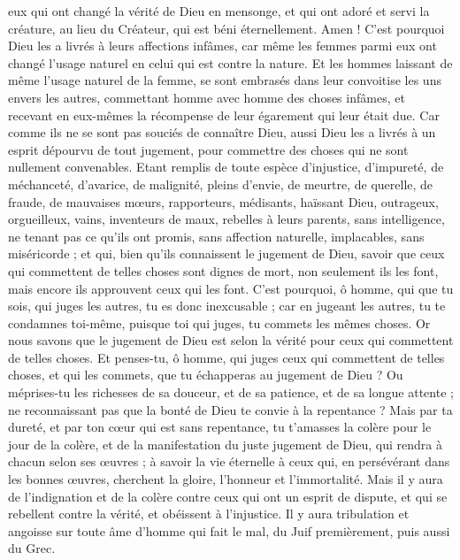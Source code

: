 \begin{multicols}{2}
eux qui ont changé la vérité de Dieu en mensonge, et qui ont adoré et servi la créature, au lieu du Créateur, qui est béni éternellement. Amen !
C'est pourquoi Dieu les a livrés à leurs affections infâmes, car même les femmes parmi eux ont changé l'usage naturel en celui qui est contre la nature.
Et les hommes laissant de même l'usage naturel de la femme, se sont embrasés dans leur convoitise les uns envers les autres, commettant homme avec homme des choses infâmes, et recevant en eux-mêmes la récompense de leur égarement qui leur était due.
Car comme ils ne se sont pas souciés de connaître Dieu, aussi Dieu les a livrés à un esprit dépourvu de tout jugement, pour commettre des choses qui ne sont nullement convenables.
Etant remplis de toute espèce d'injustice, d'impureté, de méchanceté, d'avarice, de malignité, pleins d'envie, de meurtre, de querelle, de fraude, de mauvaises mœurs,
rapporteurs, médisants, haïssant Dieu, outrageux, orgueilleux, vains, inventeurs de maux, rebelles à leurs parents,
sans intelligence, ne tenant pas ce qu'ils ont promis, sans affection naturelle, implacables, sans miséricorde ;
et qui, bien qu'ils connaissent le jugement de Dieu, savoir que ceux qui commettent de telles choses sont dignes de mort, non seulement ils les font, mais encore ils approuvent ceux qui les font.
\VerseOne{}C'est pourquoi, ô homme, qui que tu sois, qui juges les autres, tu es donc inexcusable ; car en jugeant les autres, tu te condamnes toi-même, puisque toi qui juges, tu commets les mêmes choses.
Or nous savons que le jugement de Dieu est selon la vérité pour ceux qui commettent de telles choses.
Et penses-tu, ô homme, qui juges ceux qui commettent de telles choses, et qui les commets, que tu échapperas au jugement de Dieu ?
Ou méprises-tu les richesses de sa douceur, et de sa patience, et de sa longue attente ; ne reconnaissant pas que la bonté de Dieu te convie à la repentance ?
Mais par ta dureté, et par ton cœur qui est sans repentance, tu t'amasses la colère pour le jour de la colère, et de la manifestation du juste jugement de Dieu,
qui rendra à chacun selon ses œuvres ;
à savoir la vie éternelle à ceux qui, en persévérant dans les bonnes œuvres, cherchent la gloire, l'honneur et l'immortalité.
Mais il y aura de l'indignation et de la colère contre ceux qui ont un esprit de dispute, et qui se rebellent contre la vérité, et obéissent à l'injustice.
Il y aura tribulation et angoisse sur toute âme d'homme qui fait le mal, du Juif premièrement, puis aussi du Grec.

\end{multicols}
